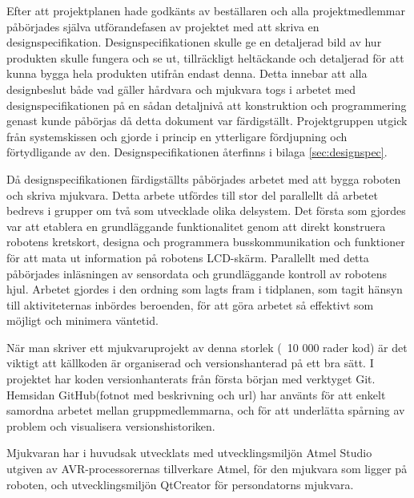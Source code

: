 Efter att projektplanen hade godkänts av beställaren och alla projektmedlemmar påbörjades själva utförandefasen av projektet med att skriva en designspecifikation. Designspecifikationen skulle ge en detaljerad bild av hur produkten skulle fungera och se ut, tillräckligt heltäckande och detaljerad för att kunna bygga hela produkten utifrån endast denna. Detta innebar att alla designbeslut både vad gäller hårdvara och mjukvara togs i arbetet med designspecifikationen på en sådan detaljnivå att konstruktion och programmering genast kunde påbörjas då detta dokument var färdigställt. Projektgruppen utgick från systemskissen och gjorde i princip en ytterligare fördjupning och förtydligande av den. Designspecifikationen återfinns i bilaga \ref{sec:designspec}.

Då designspecifikationen färdigställts påbörjades arbetet med att bygga roboten och skriva mjukvara. Detta arbete utfördes till stor del parallellt då arbetet bedrevs i grupper om två som utvecklade olika delsystem. Det första som gjordes var att etablera en grundläggande funktionalitet genom att direkt konstruera robotens kretskort, designa och programmera busskommunikation och funktioner för att mata ut information på robotens LCD-skärm. Parallellt med detta påbörjades inläsningen av sensordata och grundläggande kontroll av robotens hjul. Arbetet gjordes i den ordning som lagts fram i tidplanen, som tagit hänsyn till aktiviteternas inbördes beroenden, för att göra arbetet så effektivt som möjligt och minimera väntetid. 

När man skriver ett mjukvaruprojekt av denna storlek (~10 000 rader kod) är det viktigt att källkoden är organiserad och versionshanterad på ett bra sätt. I projektet har koden versionhanterats från första början med verktyget Git. Hemsidan GitHub(fotnot med beskrivning och url) har använts för att enkelt samordna arbetet mellan gruppmedlemmarna, och för att underlätta spårning av problem och visualisera versionshistoriken.

Mjukvaran har i huvudsak utvecklats med utvecklingsmiljön Atmel Studio utgiven av AVR-processorernas tillverkare Atmel, för den mjukvara som ligger på roboten, och utvecklingsmiljön QtCreator för persondatorns mjukvara.